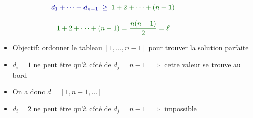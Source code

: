 \documentclass[12pt]{article}
\begin{document}
\[
\hspace*{-1.5cm}
\color{blue!60!black}{d_1 + \cdots + d_{n-1}}
\;\ge\;
\color{green!40!black}{1 + 2 + \cdots + (n-1)}
\]

\vspace{-0.8cm}

\[
\hspace*{-1.5cm}
\color{green!40!black}{1 + 2 + \cdots + (n-1)} = \frac{n(n-1)}{2} = \ell
\]

\vspace{1cm}


\begin{itemize}
    \renewcommand{\labelitemi}{\textbullet}
	\setlength\itemsep{1em}
    \item Objectif: ordonner le tableau $[1,\dots,n-1]$ pour trouver la solution parfaite
    \item $d_i = 1$ ne peut être qu'à côté de $d_j=n-1$ $\implies$ cette valeur se trouve au bord
    \item On a donc $d=[1, n-1, \ldots]$
	\item $d_i=2$ ne peut être qu'à côté de $d_j=n-1$ $\implies$ impossible
\end{itemize}
\end{document}
